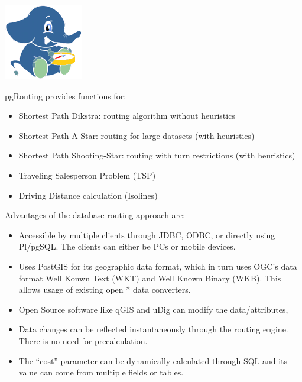\documentclass[a4paper,10pt,english]{manual}
\begin{document}
{\hfill\includegraphics{pgrouting.png}\hfill}

pgRouting provides functions for:
\begin{itemize}
\item {} 
Shortest Path Dikstra: routing algorithm without heuristics

\item {} 
Shortest Path A-Star: routing for large datasets (with heuristics)

\item {} 
Shortest Path Shooting-Star: routing with turn restrictions (with heuristics)

\item {} 
Traveling Salesperson Problem (TSP)

\item {} 
Driving Distance calculation (Isolines)

\end{itemize}

Advantages of the database routing approach are:
\begin{itemize}
\item {} 
Accessible by multiple clients through JDBC, ODBC, or directly using Pl/pgSQL. The clients can either be PCs or mobile devices.

\item {} 
Uses PostGIS for its geographic data format, which in turn uses OGC's data format Well Konwn Text (WKT) and Well Known Binary (WKB). This allows usage of existing open * data converters.

\item {} 
Open Source software like qGIS and uDig can modify the data/attributes,

\item {} 
Data changes can be reflected instantaneously through the routing engine. There is no need for precalculation.

\item {} 
The ``cost'' parameter can be dynamically calculated through SQL and its value can come from multiple fields or tables.

\end{itemize}
\end{document}
